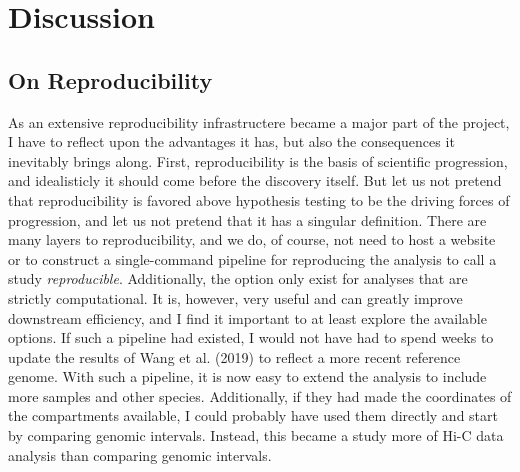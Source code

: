\documentclass[
  11pt,
  a4paper,
]{scrbook}
\begin{document}
\chapter{Discussion}\label{sec-discussion}

\section{On Reproducibility}\label{on-reproducibility}

As an extensive reproducibility infrastructere became a major part of
the project, I have to reflect upon the advantages it has, but also the
consequences it inevitably brings along. First, reproducibility is the
basis of scientific progression, and idealisticly it should come before
the discovery itself. But let us not pretend that reproducibility is
favored above hypothesis testing to be the driving forces of
progression, and let us not pretend that it has a singular definition.
There are many layers to reproducibility, and we do, of course, not need
to host a website or to construct a single-command pipeline for
reproducing the analysis to call a study \emph{reproducible}.
Additionally, the option only exist for analyses that are strictly
computational. It is, however, very useful and can greatly improve
downstream efficiency, and I find it important to at least explore the
available options. If such a pipeline had existed, I would not have had
to spend weeks to update the results of Wang et al. (2019) to reflect a
more recent reference genome. With such a pipeline, it is now easy to
extend the analysis to include more samples and other species.
Additionally, if they had made the coordinates of the compartments
available, I could probably have used them directly and start by
comparing genomic intervals. Instead, this became a study more of Hi-C
data analysis than comparing genomic intervals.
\end{document}

